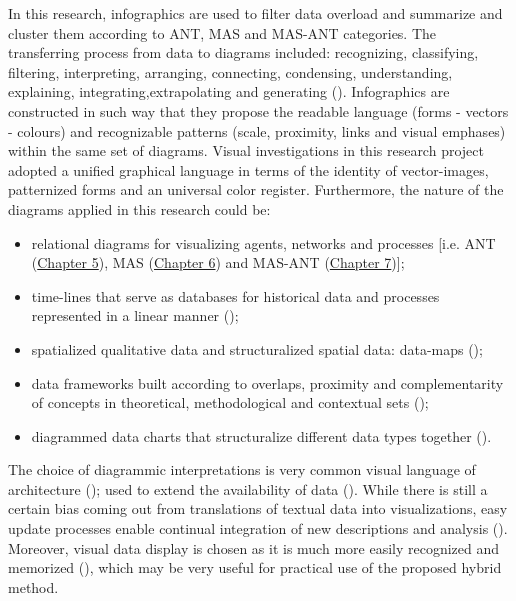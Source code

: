 \documentclass[11pt]{report}
\begin{document}
In this research, infographics are used to filter data overload and summarize and cluster them according to ANT, MAS and MAS-ANT categories.
The transferring process from data to diagrams included: recognizing, classifying, filtering, interpreting, arranging, connecting, condensing, understanding, explaining, integrating,extrapolating and generating (\href{McCandless}{\citealt{mccandless_knowledge_2014}}).
Infographics are constructed in such way that they propose the readable  language (forms - vectors - colours) and recognizable patterns (scale, proximity, links and visual emphases) within the same set of diagrams.
Visual investigations in this research project adopted a unified graphical language in terms of the identity of vector-images, patternized forms and an universal color register.
Furthermore, the nature of the diagrams applied in this research could be:
\begin{itemize}
\item relational diagrams for visualizing agents, networks and processes [i.e. ANT (\href{Chapter 5}{Chapter 5}), MAS (\href{Chapter 6}{Chapter 6}) and MAS-ANT (\href{Chapter 7}{Chapter 7})];
\item time-lines that serve as databases for historical data and processes represented in a linear manner (\href{Rosenberg}{\citealt{rosenberg_cartographies_2012}});
\item spatialized qualitative data and structuralized spatial data: data-maps (\href{Raisson}{\citealt{raisson_2033_2010}});
\item data frameworks built according to overlaps, proximity and complementarity of concepts in theoretical, methodological and contextual sets (\href{Caraes}{\citealt{caraes_images_2011}});
\item diagrammed data charts that structuralize different data types together (\href{Yau}{\citealt{yau_visualize_2013}}).
\end{itemize}

The choice of diagrammic interpretations is very common visual language of architecture (\href{Chaplin}{\citealt{chaplin_architecture_2015}}); used to extend the availability of data (\href{Hemmersam}{\citealt{hemmersam_exploring_2016}}).
While there is still a certain bias coming out from translations of textual data into visualizations, easy update processes enable continual integration of new descriptions and analysis (\href{Tufte}{\citealt{tufte_visual_2001}}). 
Moreover, visual data display is chosen as it is much more easily recognized and memorized (\href{Krum}{\citealt{krum_cool_2013}}), which may be very useful for practical use of the proposed hybrid method.
\end{document}
